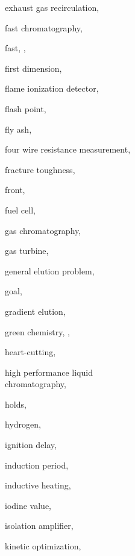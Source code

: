 \begin{theindex}
  \item \lowercase {exhaust gas recirculation}, 
  \item \lowercase {fast chromatography}, 
  \item \lowercase {fast}, , 
  \item \lowercase {first dimension}, 
  \item \lowercase {flame ionization detector}, 
  \item \lowercase {flash point}, 
  \item \lowercase {fly ash}, 
  \item \lowercase {four wire resistance measurement}, 
  \item \lowercase {fracture toughness}, 
  \item \lowercase {front}, 
  \item \lowercase {fuel cell}, 
  \item \lowercase {gas chromatography}, 
  \item \lowercase {gas turbine}, 
  \item \lowercase {general elution problem}, 
  \item \lowercase {goal}, 
  \item \lowercase {gradient elution}, 
  \item \lowercase {green chemistry}, , 
  \item \lowercase {heart-cutting}, 
  \item \lowercase {high performance liquid \\chromatography}, 
  \item \lowercase {holds}, 
  \item \lowercase {hydrogen}, 
  \item \lowercase {ignition delay}, 
  \item \lowercase {induction period}, 
  \item \lowercase {inductive heating}, 
  \item \lowercase {iodine value}, 
  \item \lowercase {isolation amplifier}, 
  \item \lowercase {kinetic optimization}, 

\end{theindex}
